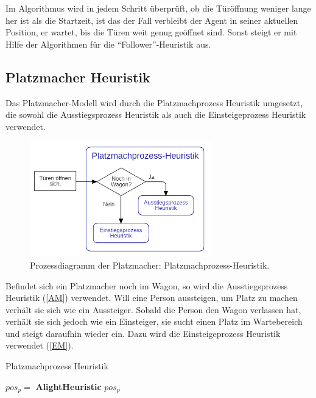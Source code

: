 Im Algorithmus wird in jedem Schritt überprüft, ob die Türöffnung weniger lange her ist als die Startzeit, ist das der Fall verbleibt der Agent in seiner aktuellen Position, er wartet, bis die Türen weit genug geöffnet sind. Sonst steigt er mit Hilfe der Algorithmen für die "`Follower"'-Heuristik aus.

\subsection{Platzmacher Heuristik}
Das Platzmacher-Modell wird durch die Platzmachprozess Heuristik umgesetzt, die sowohl die Ausstiegsprozess Heuristik als auch die Einsteigeprozess Heuristik verwendet.
\begin{figure}[H]
	\centering
		\includegraphics[width=0.7\textwidth]{pictures/model/algorithm/spacemaker/spacemaker_heuristic.png}
	\caption{Prozessdiagramm der Platzmacher: Platzmachprozess-Heuristik.}
	\label{fig:PH}
\end{figure}
Befindet sich ein Platzmacher noch im Wagon, so wird die Ausstiegsprozess Heuristik (\ref{AM}) verwendet. Will eine Person aussteigen, um Platz zu machen verhält sie sich wie ein Aussteiger. Sobald die Person den Wagon verlassen hat, verhält sie sich jedoch wie ein Einsteiger, sie sucht einen Platz im Wartebereich und steigt daraufhin wieder ein. Dazu wird die Einsteigeprozess Heuristik verwendet (\ref{EM}).

\begin{algorithm} [H]
	\caption{Platzmachprozess Heuristik}
	
	\SpacemakerHeuristic{} {
		  {
			$pos_p = $ \textbf{AlightHeuristic}
		} 
		\Return $pos_p$
	}
\end{algorithm}

